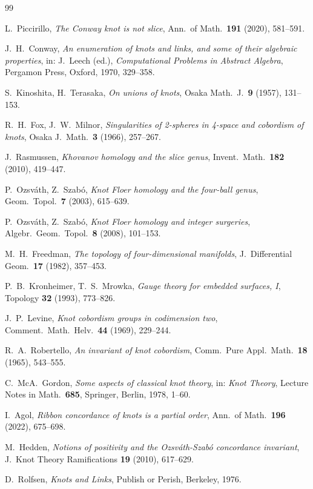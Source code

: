 \documentclass[12pt,a4paper]{amsart}
\theoremstyle{definition}
\theoremstyle{remark}
\begin{document}
\begin{thebibliography}{99}

L.~Piccirillo,
\textit{The Conway knot is not slice},
Ann.\ of Math.\ \textbf{191} (2020), 581--591.

J.~H.~Conway,
\textit{An enumeration of knots and links, and some of their algebraic
properties},
in: J.~Leech (ed.), \textit{Computational Problems in Abstract Algebra},
Pergamon Press, Oxford, 1970, 329--358.

S.~Kinoshita, H.~Terasaka,
\textit{On unions of knots},
Osaka Math.\ J.\ \textbf{9} (1957), 131--153.

R.~H.~Fox, J.~W.~Milnor,
\textit{Singularities of 2-spheres in 4-space and cobordism of knots},
Osaka J.\ Math.\ \textbf{3} (1966), 257--267.

J.~Rasmussen,
\textit{Khovanov homology and the slice genus},
Invent.\ Math.\ \textbf{182} (2010), 419--447.

P.~Ozsváth, Z.~Szabó,
\textit{Knot Floer homology and the four-ball genus},
Geom.\ Topol.\ \textbf{7} (2003), 615--639.

P.~Ozsváth, Z.~Szabó,
\textit{Knot Floer homology and integer surgeries},
Algebr.\ Geom.\ Topol.\ \textbf{8} (2008), 101--153.

M.~H.~Freedman,
\textit{The topology of four-dimensional manifolds},
J.\ Differential Geom.\ \textbf{17} (1982), 357--453.

P.~B.~Kronheimer, T.~S.~Mrowka,
\textit{Gauge theory for embedded surfaces, I},
Topology \textbf{32} (1993), 773--826.

J.~P.~Levine,
\textit{Knot cobordism groups in codimension two},
Comment.\ Math.\ Helv.\ \textbf{44} (1969), 229--244.

R.~A.~Robertello,
\textit{An invariant of knot cobordism},
Comm.\ Pure Appl.\ Math.\ \textbf{18} (1965), 543--555.

C.~McA.~Gordon,
\textit{Some aspects of classical knot theory},
in: \textit{Knot Theory}, Lecture Notes in Math.\ \textbf{685},
Springer, Berlin, 1978, 1--60.

I.~Agol,
\textit{Ribbon concordance of knots is a partial order},
Ann.\ of Math.\ \textbf{196} (2022), 675--698.

M.~Hedden,
\textit{Notions of positivity and the Ozsváth-Szabó concordance invariant},
J.\ Knot Theory Ramifications \textbf{19} (2010), 617--629.

D.~Rolfsen,
\textit{Knots and Links},
Publish or Perish, Berkeley, 1976.

\end{thebibliography}
\end{document}
